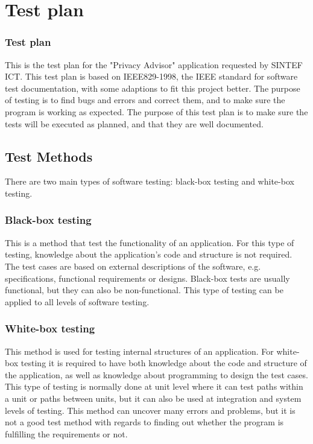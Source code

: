  

\chapter{Test plan}

\minitoc

\subsection*{Test plan}
This is the test plan for the "Privacy Advisor" application requested by SINTEF ICT. This test plan is based on IEEE829-1998, the IEEE standard for software test documentation, with some adaptions to fit this project better. The purpose of testing is to find bugs and errors and correct them, and to make sure the program is working as expected. The purpose of this test plan is to make sure the tests will be executed as planned, and that they are well documented.

\setcounter{tocdepth}{1}

\section{Test Methods}
There are two main types of software testing: black-box testing and white-box testing.
		
\subsection{Black-box testing}
This is a method that test the functionality of an application. For this type of testing, knowledge about the application's code and structure is not required. The test cases are based on external descriptions of the software, e.g. specifications, functional requirements or designs. Black-box tests are usually functional, but they can also be non-functional. This type of testing can be applied to all levels of software testing.
		
\subsection{White-box testing}
This method is used for testing internal structures of an application. For white-box testing it is required to have both knowledge about the code and structure of the application, as well as knowledge about programming to design the test cases. This type of testing is normally done at unit level where it can test paths within a unit or paths between units, but it can also be used at integration and system levels of testing. This method can uncover many errors and problems, but it is not a good test method with regards to finding out whether the program is fulfilling the requirements or not.

